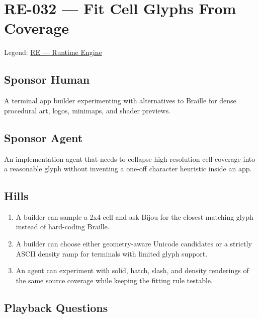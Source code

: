 \chapter{RE-032 --- Fit Cell Glyphs From Coverage}\label{record-160}

\smallskip

Legend: \href{https://github.com/flyingrobots/bijou/blob/1853ad902f6bf219326409e7f743a5a1d6517dbc/docs/legends/RE-runtime-engine.md}{RE --- Runtime Engine}

\section{Sponsor Human}\label{record-160-sponsor-human}

A terminal app builder experimenting with alternatives to Braille for dense procedural art, logos, minimaps, and shader previews.

\section{Sponsor Agent}\label{record-160-sponsor-agent}

An implementation agent that needs to collapse high-resolution cell coverage into a reasonable glyph without inventing a one-off character heuristic inside an app.

\section{Hills}\label{record-160-hills}

\begin{enumerate}
\def\labelenumi{\arabic{enumi}.}
\tightlist
\item
  A builder can sample a 2x4 cell and ask Bijou for the closest matching glyph instead of hard-coding Braille.
\item
  A builder can choose either geometry-aware Unicode candidates or a strictly ASCII density ramp for terminals with limited glyph support.
\item
  An agent can experiment with solid, hatch, slash, and density renderings of the same source coverage while keeping the fitting rule testable.
\end{enumerate}

\section{Playback Questions}\label{record-160-playback-questions}

